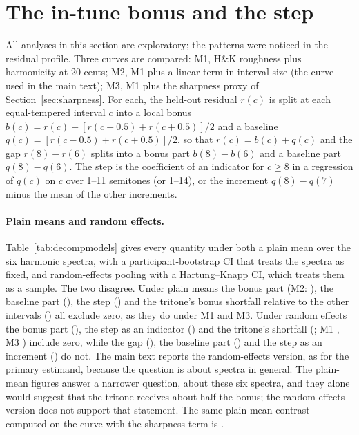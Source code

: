 \documentclass[11pt,a4paper]{article}
\newcommand{\HK}{H\&K}
\begin{document}
\section{The in-tune bonus and the step}
\label{sec:bonus}
All analyses in this section are exploratory; the patterns were noticed in the residual
profile. Three curves are compared: M1, \HK{} roughness plus harmonicity at 20 cents; M2, M1
plus a linear term in interval size (the curve used in the main text); M3, M1 plus the
sharpness proxy of Section~\ref{sec:sharpness}. For each, the held-out residual $r(c)$ is split
at each equal-tempered interval $c$ into a local bonus
$b(c)=r(c)-[r(c-0.5)+r(c+0.5)]/2$ and a baseline $q(c)=[r(c-0.5)+r(c+0.5)]/2$, so that
$r(c)=b(c)+q(c)$ and the gap $r(8)-r(6)$ splits into a bonus part $b(8)-b(6)$ and a baseline
part $q(8)-q(6)$. The step is the coefficient of an indicator for $c\ge8$ in a regression of
$q(c)$ on $c$ over 1--11 semitones (or 1--14), or the increment $q(8)-q(7)$ minus the mean of
the other increments.

\paragraph{Plain means and random effects.}
Table~\ref{tab:decompmodels} gives every quantity under both a plain mean over the six
harmonic spectra, with a participant-bootstrap CI that treats the spectra as fixed, and
random-effects pooling with a Hartung--Knapp CI, which treats them as a sample. The two
disagree. Under plain means the bonus part (M2: \decTwoBonusPartFixed), the baseline part
(\decTwoBasePartFixed), the step (\decTwoStepFixed) and the tritone's bonus shortfall relative
to the other intervals (\decTwoOtherMinusTTFixed) all exclude zero, as they do under M1 and
M3. Under random effects the bonus part (\decTwoBonusPart), the step as an indicator
(\decTwoStep) and the tritone's shortfall (\decTwoOtherMinusTT; M1 \decOneOtherMinusTT, M3
\decThreeOtherMinusTT) include zero, while the gap (\decTwoGap), the baseline part
(\decTwoBasePart) and the step as an increment (\decTwoStepInc) do not. The main text reports
the random-effects version, as for the primary estimand, because the question is about
spectra in general. The plain-mean figures answer a narrower question, about these six spectra,
and they alone would suggest that the tritone receives about half the bonus; the
random-effects version does not support that statement. The same plain-mean contrast computed
on the curve with the sharpness term is \gbSharpHarmDiff.
\end{document}

